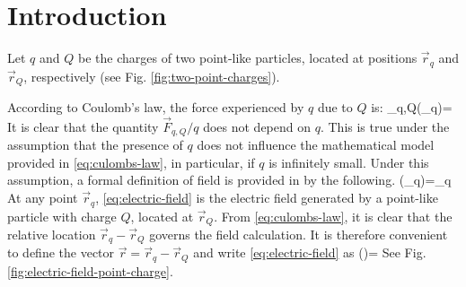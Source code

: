 \section{Introduction}
Let $q$ and $Q$ be the charges of two point-like particles, located at positions $\vec{r}_{q}$ and $\vec{r}_{Q}$, respectively
(see Fig. \ref{fig:two-point-charges}).

According to Coulomb's law, the force experienced by $q$ due to $Q$ is:
\be\label{eq:culombs-law}
_{q,Q}(_q)=
\ee
It is clear that the quantity $\vec{F}_{q,Q}/q$ does not depend on $q$. This is true under the assumption that the presence of $q$ does not influence the mathematical model provided in \ref{eq:culombs-law}, in particular, if $q$ is infinitely small. Under this assumption, a formal definition of field is provided in by the following.
\be\label{eq:electric-field}
(_{q})=\lim_{q } 
\ee
At any point $\vec{r}_{q}$, \ref{eq:electric-field} is the electric field generated by a point-like particle with charge $Q$, located at $\vec{r}_{Q}$. From \ref{eq:culombs-law}, it is clear that the relative location $\vec{r}_{q}-\vec{r}_{Q}$ governs the field calculation. It is therefore convenient to define the vector $\vec{r}=\vec{r}_{q}-\vec{r}_{Q}$ and write \ref{eq:electric-field} as 
\be\label{eq:electric-field-final}
()=
\ee
See Fig. \ref{fig:electric-field-point-charge}.
